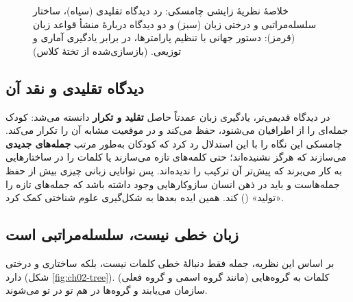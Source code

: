 \begin{figure}[htbp]
\centering
{}
\caption{خلاصهٔ نظریهٔ زایشی چامسکی: رد دیدگاه تقلیدی (سیاه)، ساختار سلسله‌مراتبی و درختی زبان (سبز) و دو دیدگاه دربارهٔ منشأ قواعد زبان (قرمز): دستور جهانی با تنظیم پارامترها، در برابر یادگیری آماری و توزیعی. (بازسازی‌شده از تختهٔ کلاس)}
\end{figure}

\subsection{دیدگاه تقلیدی و نقد آن}
در دیدگاه قدیمی‌تر، یادگیری زبان عمدتاً حاصل \textbf{تقلید و تکرار} دانسته می‌شد: کودک جمله‌ای را از اطرافیان می‌شنود، حفظ می‌کند و در موقعیت مشابه آن را تکرار می‌کند. چامسکی این نگاه را با این استدلال رد کرد که کودکان به‌طور مرتب \textbf{جمله‌های جدیدی} می‌سازند که هرگز نشنیده‌اند؛ حتی کلمه‌های تازه می‌سازند یا کلمات را در ساختارهایی به کار می‌برند که پیش‌تر آن ترکیب را ندیده‌اند. پس توانایی زبانی چیزی بیش از حفظ جمله‌هاست و باید در ذهن انسان سازوکارهایی وجود داشته باشد که جمله‌های تازه را «تولید» () کند. همین ایده بعدها به شکل‌گیری علوم شناختی کمک کرد.

\subsection{زبان خطی نیست، سلسله‌مراتبی است}
بر اساس این نظریه، جمله فقط دنبالهٔ خطی کلمات نیست، بلکه ساختاری  و درختی دارد (شکل \ref{fig:ch02-tree}). کلمات به گروه‌هایی (مانند گروه اسمی و گروه فعلی) سازمان می‌یابند و گروه‌ها در هم تو در تو می‌شوند.

